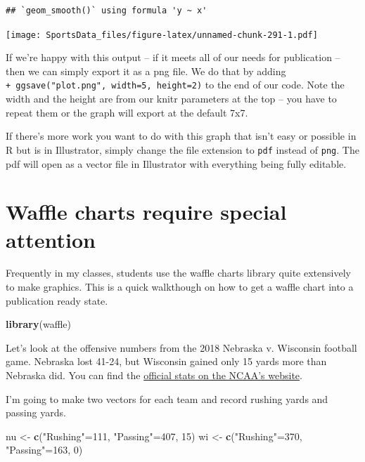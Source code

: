 \documentclass[
]{book}
\newenvironment{Shaded}{\begin{snugshade}}{\end{snugshade}}
\newcommand{\DecValTok}[1]{\textcolor[rgb]{0.00,0.00,0.81}{#1}}
\newcommand{\KeywordTok}[1]{\textcolor[rgb]{0.13,0.29,0.53}{\textbf{#1}}}
\newcommand{\NormalTok}[1]{#1}
\newcommand{\StringTok}[1]{\textcolor[rgb]{0.31,0.60,0.02}{#1}}
\begin{document}
\begin{verbatim}
## `geom_smooth()` using formula 'y ~ x'
\end{verbatim}

\texttt{[image: SportsData\_files/figure-latex/unnamed-chunk-291-1.pdf]}

If we're happy with this output -- if it meets all of our needs for publication -- then we can simply export it as a png file. We do that by adding \texttt{+\ ggsave("plot.png",\ width=5,\ height=2)} to the end of our code. Note the width and the height are from our knitr parameters at the top -- you have to repeat them or the graph will export at the default 7x7.

If there's more work you want to do with this graph that isn't easy or possible in R but is in Illustrator, simply change the file extension to \texttt{pdf} instead of \texttt{png}. The pdf will open as a vector file in Illustrator with everything being fully editable.

\hypertarget{waffle-charts-require-special-attention}{%
\section{Waffle charts require special attention}\label{waffle-charts-require-special-attention}}

Frequently in my classes, students use the waffle charts library quite extensively to make graphics. This is a quick walkthough on how to get a waffle chart into a publication ready state.

\begin{Shaded}
\begin{Highlighting}[]
\KeywordTok{library}\NormalTok{(waffle)}
\end{Highlighting}
\end{Shaded}

Let's look at the offensive numbers from the 2018 Nebraska v. Wisconsin football game. Nebraska lost 41-24, but Wisconsin gained only 15 yards more than Nebraska did. You can find the \href{https://www.ncaa.com/game/football/fbs/2018/10/06/nebraska-wisconsin/team-stats}{official stats on the NCAA's website}.

I'm going to make two vectors for each team and record rushing yards and passing yards.

\begin{Shaded}
\begin{Highlighting}[]
\NormalTok{nu <-}\StringTok{ }\KeywordTok{c}\NormalTok{(}\StringTok{"Rushing"}\NormalTok{=}\DecValTok{111}\NormalTok{, }\StringTok{"Passing"}\NormalTok{=}\DecValTok{407}\NormalTok{, }\DecValTok{15}\NormalTok{)}
\NormalTok{wi <-}\StringTok{ }\KeywordTok{c}\NormalTok{(}\StringTok{"Rushing"}\NormalTok{=}\DecValTok{370}\NormalTok{, }\StringTok{"Passing"}\NormalTok{=}\DecValTok{163}\NormalTok{, }\DecValTok{0}\NormalTok{)}
\end{Highlighting}
\end{Shaded}
\end{document}
